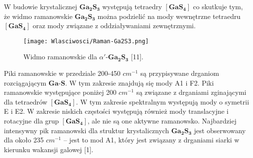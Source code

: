 W budowie krystalicznej $\mathbf{Ga_{2}S_{3}}$ występują tetraedry $[\mathbf{GaS_{4}}]$ co skutkuje tym, że widmo ramanowskie $\mathbf{Ga_{2}S_{3}}$ można podzielić na mody wewnętrzne tetraedru $[\mathbf{GaS_{4}}]$ oraz mody związane
z oddziaływaniami zewnętrznymi.


\begin{figure}[H]
	\begin{center}
		\texttt{[image: Wlasciwosci/Raman-Ga2S3.png]}
		\caption{Widmo ramanowskie dla $\alpha'$-$\mathbf{Ga_{2}S_{3}}$ [11].}
	\end{center}
\end{figure}

Piki ramanowskie w przedziale 200-450 $cm^{-1}$ są przypisywane drganiom rozciągającym $\mathbf{Ga}$-$\mathbf{S}$. W tym zakresie znajdują się mody A1 i F2. Piki ramanowskie występujące poniżej 200 $cm^{-1}$ są związane z drganiami zginającymi dla tetraedrów $[\mathbf{GaS_{4}}]$. 
W tym zakresie spektralnym występują mody o symetrii E i E2. W zakresie niskich częstości występują również mody translacyjne i rotacyjne dla grup $[\mathbf{GaS_{4}}]$, ale nie są one aktywne ramanowsko. Najbardziej intensywny pik ramanowski dla struktur krystalicznych $\mathbf{Ga_{2}S_{3}}$ jest obserwowany dla około 235 $cm^{-1}$ – jest to mod A1, który jest związany z drganiami siarki w kierunku wakansji galowej [1].





